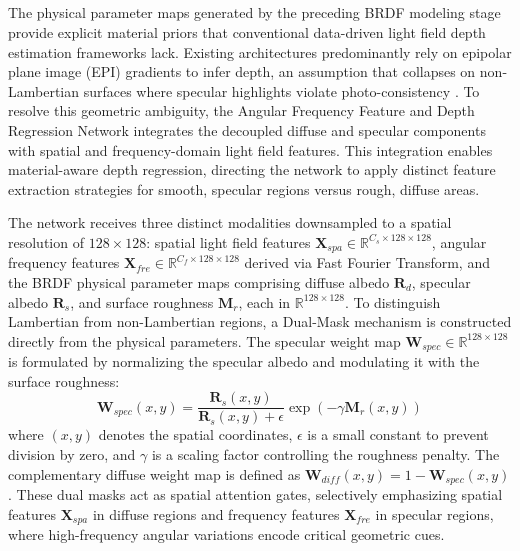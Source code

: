 \documentclass[lettersize,journal]{IEEEtran}
\begin{document}
\subsection{}

The physical parameter maps generated by the preceding BRDF modeling stage provide explicit material priors that conventional data-driven light field depth estimation frameworks lack. Existing architectures \cite{heber2018, wanner2014} predominantly rely on epipolar plane image (EPI) gradients to infer depth, an assumption that collapses on non-Lambertian surfaces where specular highlights violate photo-consistency \cite{li2021, zhang2023}. To resolve this geometric ambiguity, the Angular Frequency Feature and Depth Regression Network integrates the decoupled diffuse and specular components with spatial and frequency-domain light field features. This integration enables material-aware depth regression, directing the network to apply distinct feature extraction strategies for smooth, specular regions versus rough, diffuse areas.

The network receives three distinct modalities downsampled to a spatial resolution of $128 \times 128$: spatial light field features $\mathbf{X}_{spa} \in \mathbb{R}^{C_s \times 128 \times 128}$, angular frequency features $\mathbf{X}_{fre} \in \mathbb{R}^{C_f \times 128 \times 128}$ derived via Fast Fourier Transform, and the BRDF physical parameter maps comprising diffuse albedo $\mathbf{R}_d$, specular albedo $\mathbf{R}_s$, and surface roughness $\mathbf{M}_r$, each in $\mathbb{R}^{128 \times 128}$. To distinguish Lambertian from non-Lambertian regions, a Dual-Mask mechanism is constructed directly from the physical parameters. The specular weight map $\mathbf{W}_{spec} \in \mathbb{R}^{128 \times 128}$ is formulated by normalizing the specular albedo and modulating it with the surface roughness:
\begin{equation}
\mathbf{W}_{spec}(x,y) = \frac{\mathbf{R}_s(x,y)}{\mathbf{R}_s(x,y) + \epsilon} \exp\left(-\gamma \mathbf{M}_r(x,y)\right)
\end{equation}
where $(x,y)$ denotes the spatial coordinates, $\epsilon$ is a small constant to prevent division by zero, and $\gamma$ is a scaling factor controlling the roughness penalty. The complementary diffuse weight map is defined as $\mathbf{W}_{diff}(x,y) = 1 - \mathbf{W}_{spec}(x,y)$. These dual masks act as spatial attention gates, selectively emphasizing spatial features $\mathbf{X}_{spa}$ in diffuse regions and frequency features $\mathbf{X}_{fre}$ in specular regions, where high-frequency angular variations encode critical geometric cues.
\end{document}
